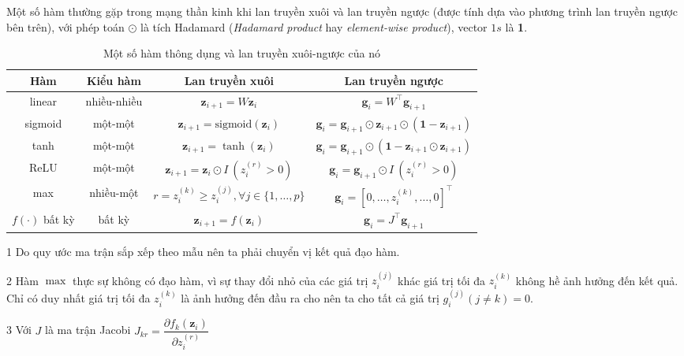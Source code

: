 Một số hàm thường gặp trong mạng thần kinh khi lan truyền xuôi và lan truyền ngược (được tính dựa vào phương trình lan truyền ngược bên trên), với phép toán $\odot$ là tích Hadamard (\textit{Hadamard product} hay \textit{element-wise product}), vector $1s$ là \textbf 1.
\begin{table}[htbp]
    \centering
    \caption{Một số hàm thông dụng và lan truyền xuôi-ngược của nó \cite{Aggarwal2023-zk}}
    \label{table:derivative-forward-backward}
    \begin{threeparttable}
        \begin{tabularx}{\textwidth}{ c c C{1} C{1} }
            \toprule
            \textbf{Hàm}      & \textbf{Kiểu hàm} & \textbf{Lan truyền xuôi}                              & \textbf{Lan truyền ngược}                                                           \\\midrule
            linear            & nhiều-nhiều       & $\mathbf z_{i+1}=W\mathbf z_i$                        & $\mathbf g_i=W^\intercal\mathbf g_{i+1}$                                   \\\midrule
            sigmoid           & một-một           & $\mathbf z_{i+1}=\text{sigmoid}(\mathbf z_i)$         & $\mathbf g_i=\mathbf g_{i+1}\odot\mathbf z_{i+1}\odot(\mathbf 1-\mathbf z_{i+1})$   \\\midrule
            tanh              & một-một           & $\mathbf z_{i+1}=\tanh(\mathbf z_i)$                  & $\mathbf g_i=\mathbf g_{i+1}\odot(\mathbf 1 - \mathbf z_{i+1}\odot\mathbf z_{i+1})$ \\\midrule
            ReLU              & một-một           & $\mathbf z_{i+1}=\mathbf z_i\odot I\ (z_i^{(r)}>0)$   & $\mathbf g_i=\mathbf g_{i+1}\odot I\ (z_i^{(r)}>0)$                                 \\\midrule
            max               & nhiều-một         & $r=z_i^{(k)}\geq z_i^{(j)},\forall j\in\{1,\dots,p\}$ & $\mathbf g_i=[0,\dots,z_i^{(k)},\dots,0]^\intercal$                        \\\midrule
            $f(\cdot)$ bất kỳ & bất kỳ            & $\mathbf z_{i+1}=f(\mathbf z_i)$                      & $\mathbf g_i=J^\intercal\mathbf g_{i+1}$                                   \\
            \bottomrule
        \end{tabularx}
        \begin{tablenotes}
            \item[1] Do quy ước ma trận sắp xếp theo mẫu nên ta phải chuyển vị kết quả đạo hàm.
            \item[2] Hàm $\max$ thực sự không có đạo hàm, vì sự thay đổi nhỏ của các giá trị $z_i^{(j)}$ khác giá trị tối đa $z_i^{(k)}$ không hề ảnh hưởng đến kết quả. Chỉ có duy nhất giá trị tối đa $z_i^{(k)}$ là ảnh hưởng đến đầu ra cho nên ta cho tất cả giá trị $g_i^{(j)}(j\neq k)=0$.
            \item[3] Với $J$ là ma trận Jacobi $J_{kr}=\dfrac{\partial f_k(\mathbf z_i)}{\partial z_i^{(r)}}$
        \end{tablenotes}
    \end{threeparttable}
\end{table}

